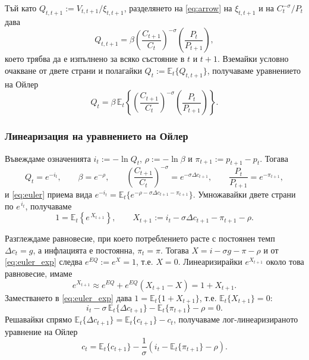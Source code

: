 Тъй като $Q_{t,t+1} := V_{t,t+1} / \xi_{t,t+1}$, разделянето на \eqref{eq:arrow} на $\xi_{t,t+1}$ и на $C_t^{-\sigma}/P_t$ дава
\begin{equation}
Q_{t,t+1} = \beta \left( \frac{C_{t+1}}{C_t} \right)^{-\sigma} \left( \frac{P_t}{P_{t+1}} \right),
\label{eq:sdf}
\end{equation}
което трябва да е изпълнено за всяко състояние в $t$ и $t+1$. Вземайки условно очакване от двете страни и полагайки $Q_t := \mathbb{E}_t\{Q_{t,t+1}\}$, получаваме уравнението на Ойлер
\begin{equation}
Q_t = \beta\, \mathbb{E}_t \left\{ \left( \frac{C_{t+1}}{C_t} \right)^{-\sigma} \left( \frac{P_t}{P_{t+1}} \right) \right\}.
\label{eq:euler}
\end{equation}

\subsubsection*{Линеаризация на уравнението на Ойлер}

Въвеждаме означенията $i_t := -\ln Q_t$, $\rho := -\ln \beta$ и $\pi_{t+1} := p_{t+1} - p_t$. Тогава
\[
Q_t = e^{-i_t}, \qquad \beta = e^{-\rho}, \qquad
\left( \frac{C_{t+1}}{C_t} \right)^{-\sigma} = e^{-\sigma \Delta c_{t+1}}, \qquad
\frac{P_t}{P_{t+1}} = e^{-\pi_{t+1}},
\]
и \eqref{eq:euler} приема вида $e^{-i_t} = \mathbb{E}_t\{ e^{-\rho - \sigma\Delta c_{t+1} - \pi_{t+1}} \}$. Умножавайки двете страни по $e^{\,i_t}$, получаваме
\begin{equation}
1 = \mathbb{E}_t \left\{ e^{\, X_{t+1}} \right\},
\qquad X_{t+1} := i_t - \sigma \Delta c_{t+1} - \pi_{t+1} - \rho.
\label{eq:euler_exp}
\end{equation}

Разглеждаме равновесие, при което потреблението расте с постоянен темп $\Delta c_t = g$, а инфлацията е постоянна, $\pi_t = \pi$. Тогава $X = i - \sigma g - \pi - \rho$ и от \eqref{eq:euler_exp} следва $e^{EQ} := e^{X} = 1$, т.е. $X = 0$. Линеаризирайки $e^{X_{t+1}}$ около това равновесие, имаме
\begin{equation}
e^{X_{t+1}} \approx e^{EQ} + e^{EQ}(X_{t+1} - X) = 1 + X_{t+1}.
\label{eq:euler_linearize}
\end{equation}
Заместването в \eqref{eq:euler_exp} дава $1 = \mathbb{E}_t\{1 + X_{t+1}\}$, т.е. $\mathbb{E}_t\{X_{t+1}\} = 0$:
\[
i_t - \sigma\, \mathbb{E}_t\{ \Delta c_{t+1} \} - \mathbb{E}_t\{\pi_{t+1}\} - \rho = 0.
\]
Решавайки спрямо $\mathbb{E}_t\{\Delta c_{t+1}\} = \mathbb{E}_t\{c_{t+1}\} - c_t$, получаваме лог-линеаризираното уравнение на Ойлер
\begin{equation}
c_t = \mathbb{E}_t\{ c_{t+1} \} - \frac{1}{\sigma} \left( i_t - \mathbb{E}_t\{ \pi_{t+1} \} - \rho \right).
\label{eq:euler_log}
\end{equation}

